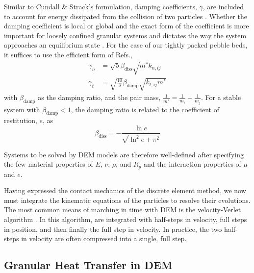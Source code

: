 \documentclass[11pt]{report} %
\begin{document}
Similar to Cundall \& Strack's formulation, damping coefficients, $\gamma$, are included to account for energy dissipated from the collision of two particles \cite{DiRenzo2004, Tsuji1992, Tsuji1993}. Whether the damping coefficient is local or global and the exact form of the coefficient is more important for loosely confined granular systems and dictates the way the system approaches an equilibrium state \cite{Makse2004}. For the case of our tightly packed pebble beds, it suffices to use the efficient form of Refs.\cite{Dippel1996, Makse2004, Brilliantov1996, Zhang2005, Zhu2007},
\begin{subequations}
\begin{align}
	\gamma_n &= \sqrt{5}\beta_\text{diss}\sqrt{m^*k_{n,ij}} \\
	\gamma_t &= \sqrt{\frac{10}{3}}\beta_\text{damp}\sqrt{k_{t,ij} m^*}
\end{align}
\end{subequations}
with $\beta_\text{damp}$ as the damping ratio, and the pair mass, $\frac{1}{m^*} = \frac{1}{m_i} + \frac{1}{m_j}$. For a stable system with $\beta_\text{damp} < 1$, the damping ratio is related to the coefficient of restitution, $e$, as
\begin{equation}
	\beta_\text{diss} = -\frac{\ln{e}}{\sqrt{\ln^2{e}+\pi^2}}
\end{equation}

Systems to be solved by DEM models are therefore well-defined after specifying the few material properties of $E$, $\nu$, $\rho$, and $R_p$ and the interaction properties of $\mu$ and $e$.

Having expressed the contact mechanics of the discrete element method, we now must integrate the kinematic equations of the particles to resolve their evolutions. The most common means of marching in time with DEM is the velocity-Verlet algorithm \cite{Kruggel-Emden2008}. In this algorithm,  are integrated with half-steps in velocity, full steps in position, and then finally the full step in velocity. In practice, the two half-steps in velocity are often compressed into a single, full step.


\subsection{Granular Heat Transfer in DEM}\label{sec:dem-heat-transfer}
\end{document}
